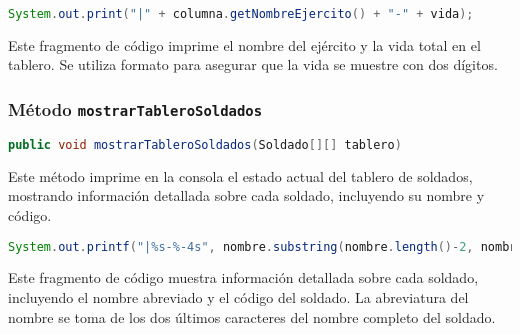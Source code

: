 \begin{lstlisting}[language=Java]
System.out.print("|" + columna.getNombreEjercito() + "-" + vida);
\end{lstlisting}

Este fragmento de código imprime el nombre del ejército y la vida total en el tablero. Se utiliza formato para asegurar que la vida se muestre con dos dígitos.

\subsubsection{Método \texttt{mostrarTableroSoldados}}
\begin{lstlisting}[language=Java]
public void mostrarTableroSoldados(Soldado[][] tablero)
\end{lstlisting}
Este método imprime en la consola el estado actual del tablero de soldados, mostrando información detallada sobre cada soldado, incluyendo su nombre y código.

\begin{lstlisting}[language=Java]
System.out.printf("|%s-%-4s", nombre.substring(nombre.length()-2, nombre.length()-1), columna.getNombreCode());
\end{lstlisting}

Este fragmento de código muestra información detallada sobre cada soldado, incluyendo el nombre abreviado y el código del soldado. La abreviatura del nombre se toma de los dos últimos caracteres del nombre completo del soldado.
